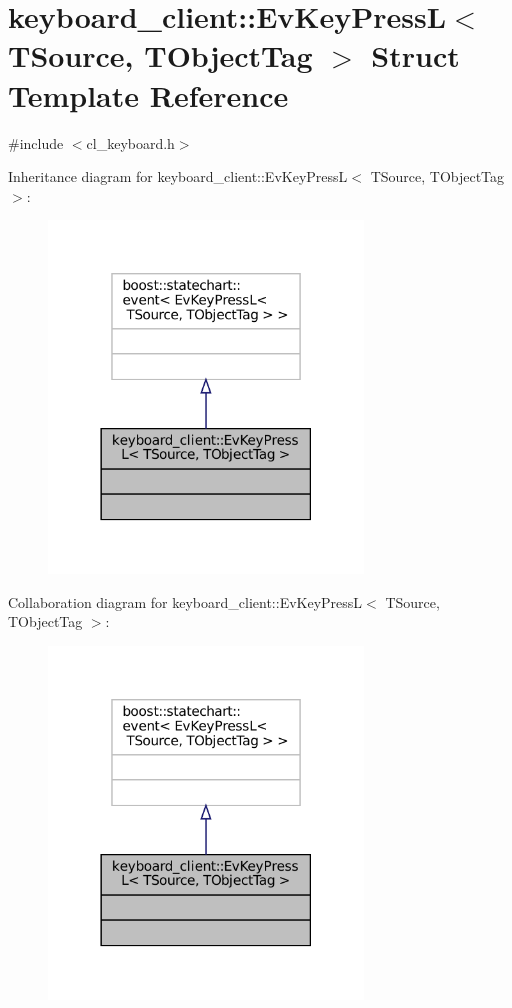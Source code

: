 \hypertarget{structkeyboard__client_1_1EvKeyPressL}{}\section{keyboard\+\_\+client\+:\+:Ev\+Key\+PressL$<$ T\+Source, T\+Object\+Tag $>$ Struct Template Reference}
\label{structkeyboard__client_1_1EvKeyPressL}


{\ttfamily \#include $<$cl\+\_\+keyboard.\+h$>$}



Inheritance diagram for keyboard\+\_\+client\+:\+:Ev\+Key\+PressL$<$ T\+Source, T\+Object\+Tag $>$\+:
\nopagebreak
\begin{figure}[H]
\begin{center}
\leavevmode
\includegraphics[width=237pt]{structkeyboard__client_1_1EvKeyPressL__inherit__graph}
\end{center}
\end{figure}


Collaboration diagram for keyboard\+\_\+client\+:\+:Ev\+Key\+PressL$<$ T\+Source, T\+Object\+Tag $>$\+:
\nopagebreak
\begin{figure}[H]
\begin{center}
\leavevmode
\includegraphics[width=237pt]{structkeyboard__client_1_1EvKeyPressL__coll__graph}
\end{center}
\end{figure}



